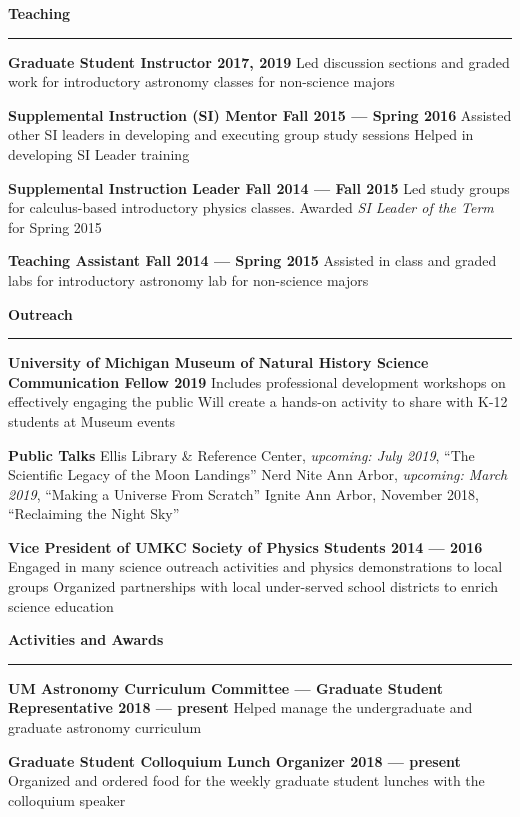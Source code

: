 \documentclass[10pt]{article}
\newcommand{\header}[1]{\vspace{2em}\par \textbf{\large #1}\strut\hrule\vspace{0em}}
\newcommand{\actionHeader}[2]{\textbf{#1 \hfill #2}}
\newcommand{\indentedItem}[1]{\newline\null\qquad #1}
\begin{document}
\header{Teaching}

\actionHeader{Graduate Student Instructor}{2017, 2019}
\indentedItem{Led discussion sections and graded work for introductory astronomy classes for non-science majors}

\actionHeader{Supplemental Instruction (SI) Mentor}{Fall 2015 --- Spring 2016}
\indentedItem{Assisted other SI leaders in developing and executing group study sessions}
\indentedItem{Helped in developing SI Leader training}

\actionHeader{Supplemental Instruction Leader}{Fall 2014 --- Fall 2015}
\indentedItem{Led study groups for calculus-based introductory physics classes.}
\indentedItem{Awarded \textit{SI Leader of the Term} for Spring 2015}

\actionHeader{Teaching Assistant}{Fall 2014 --- Spring 2015}
\indentedItem{Assisted in class and graded labs for introductory astronomy lab for non-science majors}

\pagebreak

\header{Outreach}

\actionHeader{University of Michigan Museum of Natural History Science Communication Fellow}{2019}
\indentedItem{Includes professional development workshops on effectively engaging the public}
\indentedItem{Will create a hands-on activity to share with K-12 students at Museum events}

\actionHeader{Public Talks}{}
\indentedItem{Ellis Library \& Reference Center, \textit{upcoming: July 2019}, ``The Scientific Legacy of the Moon Landings''}
\indentedItem{Nerd Nite Ann Arbor, \textit{upcoming: March 2019}, ``Making a Universe From Scratch''}
\indentedItem{Ignite Ann Arbor, November 2018, ``Reclaiming the Night Sky''}

\actionHeader{Vice President of UMKC Society of Physics Students}{2014 --- 2016}
\indentedItem{Engaged in many science outreach activities and physics demonstrations to local groups}
\indentedItem{Organized partnerships with local under-served school districts to enrich science education}

\header{Activities and Awards}

\actionHeader{UM Astronomy Curriculum Committee --- Graduate Student Representative}{2018 --- present}
\indentedItem{Helped manage the undergraduate and graduate astronomy curriculum}

\actionHeader{Graduate Student Colloquium Lunch Organizer}{2018 --- present}
\indentedItem{Organized and ordered food for the weekly graduate student lunches with the colloquium speaker}
\end{document}
